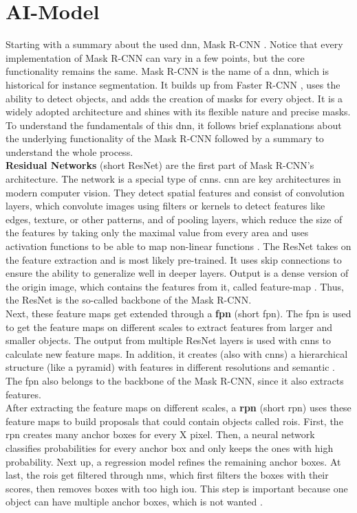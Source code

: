 	\section{AI-Model}
	\label{sec:ai-model}
		Starting with a summary about the used \ac{dnn}, Mask R-CNN \cite{Kaiming2017}. Notice that every implementation of Mask R-CNN can vary in a few points, but the core functionality remains the same.
		Mask R-CNN is the name of a \ac{dnn}, which is historical for instance segmentation. It builds up from Faster R-CNN \cite{Ren2016}, uses the ability to detect objects, and adds the creation of masks for every object. It is a widely adopted architecture and shines with its flexible nature and precise masks.\\
		To understand the fundamentals of this \ac{dnn}, it follows brief explanations about the underlying functionality of the Mask R-CNN followed by a summary to understand the whole process.\\
		\textbf{Residual Networks} (short ResNet) are the first part of Mask R-CNN's architecture. The network is a special type of \ac{cnn}s. \ac{cnn} are key architectures in modern computer vision. They detect spatial features and consist of convolution layers, which convolute images using filters or kernels to detect features like edges, texture, or other patterns, and of pooling layers, which reduce the size of the features by taking only the maximal value from every area and uses activation functions to be able to map non-linear functions \cite{Oshea2015}. The ResNet takes on the feature extraction and is most likely pre-trained. It uses skip connections to ensure the ability to generalize well in deeper layers. Output is a dense version of the origin image, which contains the features from it, called feature-map \cite{He2015}. Thus, the ResNet is the so-called backbone of the Mask R-CNN.\\
		Next, these feature maps get extended through a \textbf{\acl{fpn}} (short \ac{fpn}). The \ac{fpn} is used to get the feature maps on different scales to extract features from larger and smaller objects. The output from multiple ResNet layers is used with \ac{cnn}s to calculate new feature maps. In addition, it creates (also with \ac{cnn}s) a hierarchical structure (like a pyramid) with features in different resolutions and semantic \cite{Lin2017}. The \ac{fpn} also belongs to the backbone of the Mask R-CNN, since it also extracts features.\\
		After extracting the feature maps on different scales, a \textbf{\acl{rpn}} (short \ac{rpn}) uses these feature maps to build proposals that could contain objects called \ac{roi}s. First, the \ac{rpn} creates many anchor boxes for every X pixel. Then, a neural network classifies probabilities for every anchor box and only keeps the ones with high probability. Next up, a regression model refines the remaining anchor boxes. At last, the \ac{roi}s get filtered through \ac{nms}, which first filters the boxes with their scores, then removes boxes with too high \ac{iou}. This step is important because one object can have multiple anchor boxes, which is not wanted \cite{Ren2016}.\\
